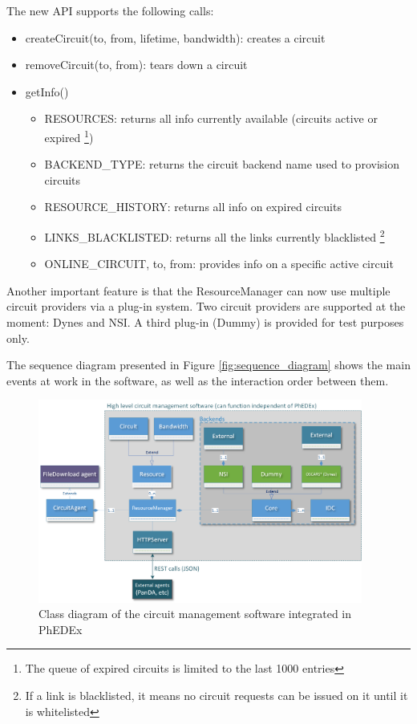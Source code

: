 The new API supports the following calls:
\begin{itemize}
  \item createCircuit(to, from, lifetime, bandwidth): creates a circuit
  \item removeCircuit(to, from): tears down a circuit
  \item getInfo()
	\begin{itemize}
		\item RESOURCES: returns all info currently available (circuits active or expired
		\footnote{The queue of expired circuits is limited to the last 1000 entries})
		\item BACKEND\_TYPE: returns the circuit backend name used to provision circuits
		\item RESOURCE\_HISTORY: returns all info on expired circuits
		\item LINKS\_BLACKLISTED: returns all the links currently blacklisted
		\footnote{If a link is blacklisted, it means no circuit requests can be issued on it
		until it is whitelisted}
		\item ONLINE\_CIRCUIT, to, from: provides info on a specific active circuit
	\end{itemize}
\end{itemize}

Another important feature is that the ResourceManager can now use multiple circuit
providers via a plug-in system. Two circuit providers are supported at the moment: Dynes and NSI.
A third plug-in (Dummy) is provided for test purposes only.

The sequence diagram presented in Figure \ref{fig:sequence_diagram} shows the main events
at work in the software, as well as the interaction order  between them.

\begin{figure}[h]
  \centering
  \includegraphics[width=0.95\textwidth]{Figures/Circuit_framework-class_diagram.png}
  \caption{Class diagram of the circuit management software integrated in PhEDEx}
  \label{fig:class_diagram}
\end{figure} 

